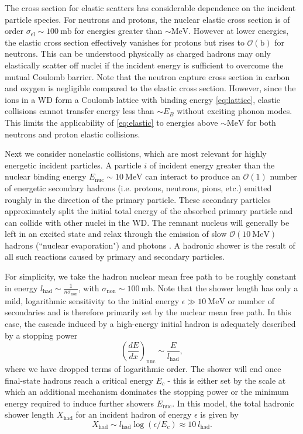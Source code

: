 \documentclass[twocolumn,showpacs,preprintnumbers,amsmath,amssymb,prd]{revtex4}
\newcommand{\OO}{\mathcal{O}}
\def\r{\right)}
\def\l{\left(}
\begin{document}
\begin{appendices}
The cross section for elastic scatters has considerable dependence on the incident particle species. For neutrons and protons, the nuclear elastic cross section is of order $\sigma_\text{el} \sim 100 ~\text{mb}$ for energies greater than $\sim \text{MeV}$. However at lower energies, the elastic cross section effectively vanishes for protons but rises to $\OO(\text{b})$ for neutrons. This can be understood physically as charged hadrons may only elastically scatter off nuclei if the incident energy is sufficient to overcome the mutual Coulomb barrier. Note that the neutron capture cross section in carbon and oxygen is negligible compared to the elastic cross section. However, since the ions in a WD form a Coulomb lattice with binding energy \eqref{eq:lattice}, elastic collisions cannot transfer energy less than $\sim E_B$ without exciting phonon modes. This limits the applicability of \eqref{eq:elastic} to energies above $\sim \text{MeV}$ for both neutrons and proton elastic collisions. 

Next we consider nonelastic collisions, which are most relevant for highly energetic incident particles. A particle $i$ of incident energy greater than the nuclear binding energy $E_\text{nuc} \sim 10 ~\text{MeV}$ can interact to produce an $\OO(1)$ number of energetic secondary hadrons (i.e. protons, neutrons, pions, etc.) emitted roughly in the direction of the primary particle. These secondary particles approximately split the initial total energy of the absorbed primary particle and can collide with other nuclei in the WD. The remnant nucleus will generally be left in an excited state and relax through the emission of slow $\OO(10 ~\text{MeV})$ hadrons (``nuclear evaporation") and photons \cite{Rossi}. A hadronic shower is the result of all such reactions caused by primary and secondary particles. 

For simplicity, we take the hadron nuclear mean free path to be roughly constant in energy $l_\text{had} \sim  \frac{1}{n \sigma_\text{non}}$, with $\sigma_\text{non} \sim 100 ~\text{mb}$. Note that the shower length has only a mild, logarithmic sensitivity to the initial energy $\epsilon \gg 10 ~\text{MeV}$ or number of secondaries and is therefore primarily set by the nuclear mean free path. In this case, the cascade induced by a high-energy initial hadron is adequately described by a stopping power
\begin{equation}
\label{eq:nucshower}
\l \frac{dE}{dx}\r_\text{nuc} \sim \frac{E}{l_\text{had}},
\end{equation}
where we have dropped terms of logarithmic order. The shower will end once final-state hadrons reach a critical energy $E_c$ - this is either set by the scale at which an additional mechanism dominates the stopping power or the minimum energy required to induce further showers $E_\text{nuc}$. In this model, the total hadronic shower length $X_{\text{had}}$ for an incident hadron of energy $\epsilon$ is given by
\begin{equation}
X_{\text{had}} \sim l_\text{had} \log{(\epsilon/E_c)} \approx 10 ~l_\text{had}.
\end{equation}
 

\end{appendices}
\end{document}
